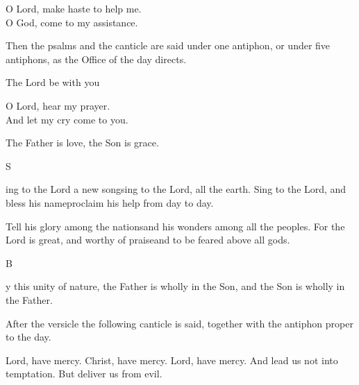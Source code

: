 \documentclass{breviary}
\begin{document}
\begin{brevbody}


\vers O Lord, make haste to help me.\\
\resp O God, come to my assistance.

\begin{rubricpar}
Then the psalms and the canticle are said under one antiphon, or under
five antiphons, as the Office of the day directs.
\end{rubricpar}

\brevrule

 The Lord be with you 

\vers O Lord, hear my prayer.\\
\resp And let my cry come to you.


 The Father is love, the Son is grace.

\opening{S}{ing} to the Lord a new song\med sing to the Lord, all
the earth. Sing to the Lord, and bless his name\med proclaim his help
from day to day.

Tell his glory among the nations\med and his wonders among all the
peoples. For the Lord is great, and worthy of praise\med and to be
feared above all gods.

\brevrule


\opening{B}{y} this unity of nature, the Father is wholly in the Son,
and the Son is wholly in the Father.

\begin{rubricpar}
After the versicle the following canticle is said, together with the
antiphon proper to the day.
\end{rubricpar}


Lord, have mercy. Christ, have mercy. Lord, have mercy.   And lead us not into temptation.
\resp But deliver us from evil.

\end{brevbody}
\end{document}

